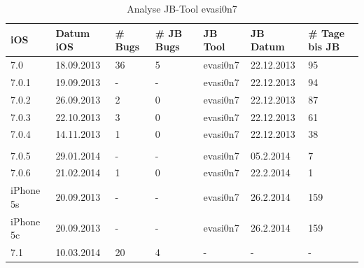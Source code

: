 \begin{table}[htp!]
    \begin{center}
        \begin{tabular}{| p{20mm} | p{18mm} | p{17mm} | p{25mm} | p{20mm} | p{22mm} | p{15mm} |} \hline
            \textbf{iOS} & \textbf{Datum iOS} & \textbf{\# Bugs} & \textbf{\# JB Bugs} & \textbf{JB Tool} & \textbf{JB Datum} & \textbf{\# Tage bis JB} \\ \hline 
7.0 & 18.09.2013 &	36 & 5 & evasi0n7 & 22.12.2013 & 95 \\ \hline
7.0.1 & 19.09.2013 & - & - & evasi0n7 & 22.12.2013 &  94 \\ \hline
7.0.2 & 26.09.2013 & 2 & 0 & evasi0n7 & 22.12.2013 & 87 \\ \hline
7.0.3 & 22.10.2013 & 3 & 0 & evasi0n7 & 22.12.2013 & 61 \\ \hline
7.0.4 & 14.11.2013 & 1 & 0 & evasi0n7 & 22.12.2013 & 38 \\ \hline
 & & & & & & \\ \hline
7.0.5 & 29.01.2014 & - & - & evasi0n7 & 05.2.2014 & 7 \\ \hline
7.0.6 & 21.02.2014 & 1 & 0 & evasi0n7 & 22.2.2014 & 1 \\ \hline
iPhone 5s & 20.09.2013 & - & - & evasi0n7 & 26.2.2014 & 159 \\ \hline
iPhone 5c & 20.09.2013	& - & - & evasi0n7 & 26.2.2014 & 159 \\ \hline
7.1 & 10.03.2014 & 20 & 4 & - & - & - \\ \hline
        \end{tabular} 
        \caption{Analyse JB-Tool evasi0n7}
        \label{tab:Analyseevasi0n7}
    \end{center}
\end{table}

